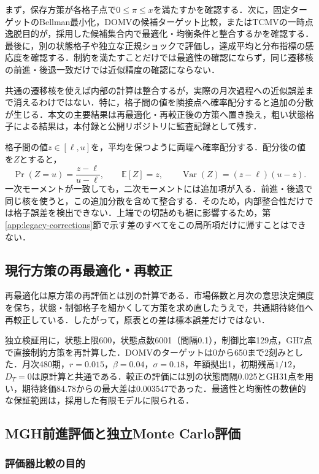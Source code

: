 \documentclass[10pt,a4paper]{article}
\theoremstyle{plain}
\theoremstyle{definition}
\newcommand{\E}{\mathbb{E}}
\DeclareMathOperator{\Var}{Var}
\begin{document}
まず，保存方策が各格子点で$0\leq\pi\leq x$を満たすかを確認する．次に，固定ターゲットのBellman最小化，DOMVの候補ターゲット比較，またはTCMVの一時点逸脱目的が，採用した候補集合内で最適化・均衡条件と整合するかを確認する．最後に，別の状態格子や独立な正規ショックで評価し，達成平均と分布指標の感応度を確認する．制約を満たすことだけでは最適性の確認にならず，同じ遷移核の前進・後退一致だけでは近似精度の確認にならない．

共通の遷移核を使えば内部の計算は整合するが，実際の月次過程への近似誤差まで消えるわけではない．特に，格子間の値を隣接点へ確率配分すると追加の分散が生じる．本文の主要結果は再最適化・再較正後の方策へ置き換え，粗い状態格子による結果は，本付録と公開リポジトリに監査記録として残す．

格子間の値$z\in[\ell,u]$を，平均を保つように両端へ確率配分する．配分後の値を$Z$とすると，
\begin{equation}
\Pr(Z=u)=\frac{z-\ell}{u-\ell},\qquad
\E[Z]=z,\qquad \Var(Z)=(z-\ell)(u-z).
\end{equation}
一次モーメントが一致しても，二次モーメントには追加項が入る．前進・後退で同じ核を使うと，この追加分散を含めて整合する．そのため，内部整合性だけでは格子誤差を検出できない．上端での切詰めも裾に影響するため，第\ref{app:legacy-corrections}節で示す差のすべてをこの局所項だけに帰すことはできない．

\subsection{現行方策の再最適化・再較正}\label{app:validation-recalibration}
再最適化は原方策の再評価とは別の計算である．市場係数と月次の意思決定頻度を保ち，状態・制御格子を細かくして方策を求め直したうえで，共通期待終価へ再較正している．したがって，原表との差は標本誤差だけではない．

独立検証用に，状態上限600，状態点数6001（間隔0.1），制御比率129点，GH7点で直接制約方策を再計算した．DOMVのターゲットは0から650まで2刻みとした．月次480期，$r=0.015$，$\beta=0.04$，$\sigma=0.18$，年額拠出1，初期残高$1/12$，$D_T=0$は原計算と共通である．較正の評価には別の状態間隔0.025とGH31点を用い，期待終価84.78からの最大差は0.003547であった．最適性と均衡性の数値的な保証範囲は，採用した有限モデルに限られる．

\subsection{MGH前進評価と独立Monte Carlo評価}\label{app:validation-evaluators}

\subsubsection{評価器比較の目的}
\end{document}
